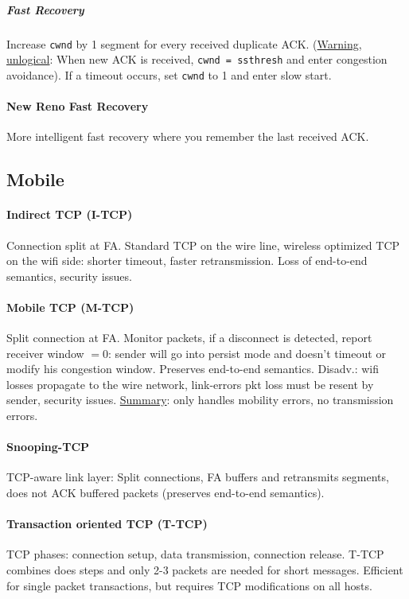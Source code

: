 \documentclass[10pt, a4paper,twocolumn]{scrartcl}
\begin{document}
\subparagraph{Fast Recovery} Increase \texttt{cwnd} by 1 segment for every received duplicate ACK. (\underline{Warning, unlogical}: When new ACK is received, \texttt{cwnd = ssthresh} and enter congestion avoidance). If a timeout occurs, set \texttt{cwnd} to 1 and enter slow start.
\paragraph{New Reno Fast Recovery} More intelligent fast recovery where you remember the last received ACK.

\subsection{Mobile}
\paragraph{Indirect TCP (I-TCP)} Connection split at FA. Standard TCP on the wire line, wireless optimized TCP on the wifi side: shorter timeout, faster retransmission. Loss of end-to-end semantics, security issues.
\paragraph{Mobile TCP (M-TCP)} Split connection at FA. Monitor packets, if a disconnect is detected, report receiver window $= 0$: sender will go into persist mode and doesn't timeout or modify his congestion window. Preserves end-to-end semantics. Disadv.: wifi losses propagate to the wire network, link-errors pkt loss must be resent by sender, security issues. \underline{Summary}: only handles mobility errors, no transmission errors.

\paragraph{Snooping-TCP} TCP-aware link layer: Split connections, FA buffers and retransmits segments, does not ACK buffered packets (preserves end-to-end semantics).

\paragraph{Transaction oriented TCP (T-TCP)} TCP phases: connection setup, data transmission, connection release. T-TCP combines does steps and only 2-3 packets are needed for short messages. Efficient for single packet transactions, but requires TCP modifications on all hosts.
\end{document}
